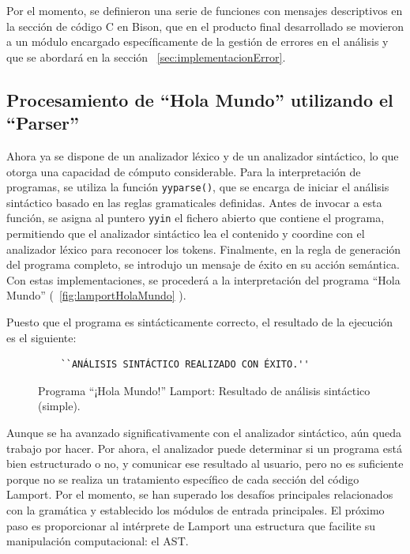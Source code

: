 Por el momento, se definieron una serie de funciones con mensajes descriptivos en la sección de código C en Bison, que en el producto final desarrollado se movieron a un módulo encargado específicamente de la gestión de errores en el análisis y que se abordará en la sección ~\ref{sec:implementacionError}.

\subsection{Procesamiento de ``Hola Mundo'' utilizando el ``Parser''}\label{subsec:holaMundoParser}

Ahora ya se dispone de un analizador léxico y de un analizador sintáctico, lo que otorga una capacidad de cómputo considerable. Para la interpretación de programas, se utiliza la función \texttt{yyparse()}, que se encarga de iniciar el análisis sintáctico basado en las reglas gramaticales definidas. Antes de invocar a esta función, se asigna al puntero \texttt{yyin} el fichero abierto que contiene el programa, permitiendo que el analizador sintáctico lea el contenido y coordine con el analizador léxico para reconocer los tokens. Finalmente, en la regla de generación del programa completo, se introdujo un mensaje de éxito en su acción semántica. Con estas implementaciones, se procederá a la interpretación del programa ``Hola Mundo'' (~\ref{fig:lamportHolaMundo} ).



Puesto que el programa es sintácticamente correcto, el resultado de la ejecución es el siguiente:

\begin{figure}[h]
\begin{verbatim}
    ``ANÁLISIS SINTÁCTICO REALIZADO CON ÉXITO.''
\end{verbatim}
\caption{Programa ``¡Hola Mundo!'' Lamport: Resultado de análisis sintáctico (simple).}
\label{fig:parserHolaMundo}
\end{figure}

Aunque se ha avanzado significativamente con el analizador sintáctico, aún queda trabajo por hacer. Por ahora, el analizador puede determinar si un programa está bien estructurado o no, y comunicar ese resultado al usuario, pero no es suficiente porque no se realiza un tratamiento específico de cada sección del código Lamport. Por el momento, se han superado los desafíos principales relacionados con la gramática y establecido los módulos de entrada principales. El próximo paso es proporcionar al intérprete de Lamport una estructura que facilite su manipulación computacional: el AST.

